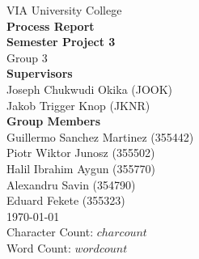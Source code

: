 \thispagestyle{empty}
\vspace*{0.15\textheight}
\begin{center}
    {\Large VIA University College}\\[2em]
    {\huge \textbf{Process Report}}\\[0.5em]
    {\Large \textbf{Semester Project 3}}\\[0.5em]
    {\Large Group 3}\\[3em]
    {\large \textbf{Supervisors}}\\[0.5em]
    {\large Joseph Chukwudi Okika (JOOK)}\\[0.5em]
    {\large Jakob Trigger Knop (JKNR)}\\[2em]
    {\large \textbf{Group Members}}\\[0.5em]
    {\large Guillermo Sanchez Martinez (355442)}\\[0.5em]
    {\large Piotr Wiktor Junosz (355502)}\\[0.5em]
    {\large Halil Ibrahim Aygun (355770)}\\[0.5em]
    {\large Alexandru Savin (354790)}\\[0.5em]
    {\large Eduard Fekete (355323)}\\[2em]
    {\large \today}\\[1em]
    {\large Character Count: $charcount$}\\[0.5em]
    {\large Word Count: $wordcount$}
\end{center}
\vfill
\clearpage